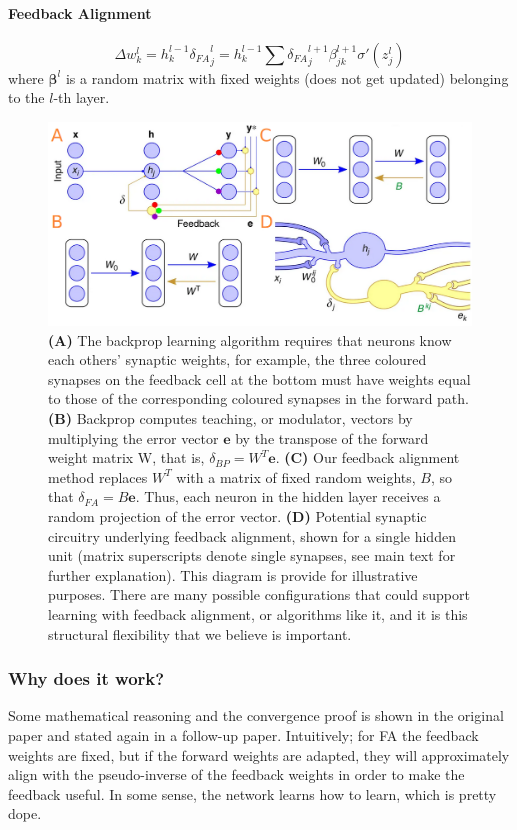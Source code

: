 \documentclass[main]{subfiles}
\begin{document}
\paragraph{Feedback Alignment}
\begin{equation}
    \Delta w_k^l = h_k^{l-1} {\delta_{FA}}_j^l = h_k^{l-1} \sum {\delta_{FA}}_j^{l+1} \beta_{j k}^{l+1} \sigma'(z_j^l)
\end{equation}
where $\bm{\beta}^l$ is a random matrix with fixed weights (does not get updated) belonging to the $l$-th layer.
\begin{figure}[H]
	\centering
	\includegraphics[width=0.99\linewidth]{02_TrainingMethodsForDeepANNs/figures/feedback_alignment.png}
	\caption{\textbf{(A)} The backprop learning algorithm requires that neurons know each others’ synaptic weights, for example, the three coloured synapses on the feedback cell at the bottom must have weights equal to those of the corresponding coloured synapses in the forward path. \textbf{(B)} Backprop computes teaching, or modulator, vectors by multiplying the error vector $\bm{e}$ by the transpose of the forward weight matrix W, that is, $\delta_{BP}=W^T\bm{e}$. \textbf{(C)} Our feedback alignment method replaces $W^T$ with a matrix of fixed random weights, $B$, so that $\delta_{FA}=B\bm{e}$. Thus, each neuron in the hidden layer receives a random projection of the error vector. \textbf{(D)} Potential synaptic circuitry underlying feedback alignment, shown for a single hidden unit (matrix superscripts denote single synapses, see main text for further explanation). This diagram is provide for illustrative purposes. There are many possible configurations that could support learning with feedback alignment, or algorithms like it, and it is this structural flexibility that we believe is important.}
	\label{fig:feedbackalignment}
\end{figure}

\subsubsection{Why does it work?}
Some mathematical reasoning and the convergence proof is shown in the original paper and stated again in a follow-up paper. Intuitively; for FA the feedback weights are fixed, but if the forward weights are adapted, they will approximately align with the pseudo-inverse of the feedback weights in order to make the feedback useful. In some sense, the network learns how to learn, which is pretty dope. 
\end{document}
